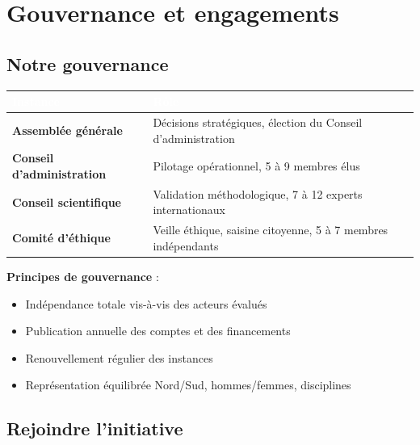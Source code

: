 \documentclass[11pt,a4paper,openany]{book}
\begin{document}
\clearpage

\part{Gouvernance et engagements}
\label{part:gouvernance}

\chapter{Notre gouvernance}

\begin{center}
\renewcommand{\arraystretch}{1.3}
\begin{tabularx}{\textwidth}{@{}>{\bfseries}p{4.5cm}X@{}}
\toprule
\rowcolor{navy}
\textcolor{white}{Instance} & \textcolor{white}{Rôle} \\
\midrule
\textbf{Assemblée générale} & Décisions stratégiques, élection du Conseil d'administration \\
\rowcolor{light}
\textbf{Conseil d'administration} & Pilotage opérationnel, 5 à 9 membres élus \\
\textbf{Conseil scientifique} & Validation méthodologique, 7 à 12 experts internationaux \\
\rowcolor{light}
\textbf{Comité d'éthique} & Veille éthique, saisine citoyenne, 5 à 7 membres indépendants \\
\bottomrule
\end{tabularx}
\end{center}

\vspace{0.5cm}

\textbf{Principes de gouvernance} :
\begin{itemize}[leftmargin=1.5em]
  \item Indépendance totale vis-à-vis des acteurs évalués
  \item Publication annuelle des comptes et des financements
  \item Renouvellement régulier des instances
  \item Représentation équilibrée Nord/Sud, hommes/femmes, disciplines
\end{itemize}

\chapter{Rejoindre l'initiative}
\end{document}

